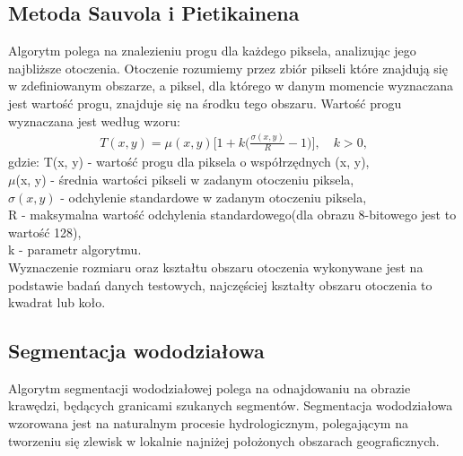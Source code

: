 \subsection{Metoda Sauvola i Pietikainena}
Algorytm polega na znalezieniu progu dla każdego piksela, analizując jego najbliższe otoczenia. Otoczenie rozumiemy przez zbiór pikseli które znajdują się w zdefiniowanym obszarze, a piksel, dla którego w danym momencie wyznaczana jest wartość progu, znajduje się na środku tego obszaru. Wartość progu wyznaczana jest według wzoru:
\begin{gather*}
  T(x, y) = \mu(x, y)\Big[1+k\big(\frac{\sigma(x, y)}{R} - 1\big)\Big], \quad k > 0,
\end{gather*}
gdzie:
T(x, y) - wartość progu dla piksela o współrzędnych (x, y),\\
$\mu$(x, y) - średnia wartości pikseli w zadanym otoczeniu piksela,\\
$\sigma(x, y)$ - odchylenie standardowe w zadanym otoczeniu piksela,\\
R - maksymalna wartość odchylenia standardowego(dla obrazu 8-bitowego jest to wartość 128),\\
k - parametr algorytmu. \\
Wyznaczenie rozmiaru oraz kształtu obszaru otoczenia wykonywane jest na podstawie badań danych testowych, najczęściej kształty obszaru otoczenia to kwadrat lub koło.
\subsection{Segmentacja wododziałowa}
Algorytm segmentacji wododziałowej polega na odnajdowaniu na obrazie krawędzi, będących granicami szukanych segmentów. Segmentacja wododziałowa wzorowana jest na naturalnym procesie hydrologicznym, polegającym na tworzeniu się zlewisk w lokalnie najniżej położonych obszarach geograficznych. \\
